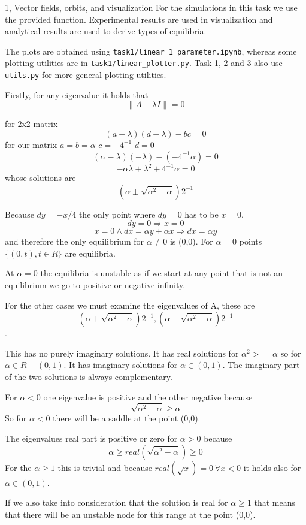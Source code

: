 \begin{task}{1, Vector fields, orbits, and visualization}
For the simulations in this task we use the provided function. Experimental results are used in visualization and analytical results are used to derive types of equilibria.

The plots are obtained using \verb|task1/linear_1_parameter.ipynb|, whereas some plotting utilities are in \verb|task1/linear_plotter.py|. Task 1, 2 and 3 also use \verb|utils.py| for more general plotting utilities.

Firstly, for any eigenvalue it holds that
$$\| A - \lambda I\| = 0$$

for 2x2 matrix
$$(a - \lambda)(d - \lambda) - bc = 0$$
for our matrix $a = b = \alpha$ $c = -4^{-1}$ $d = 0$
$$(\alpha - \lambda)(- \lambda) - (- 4^{-1}\alpha) = 0$$
$$- \alpha\lambda + \lambda^2 + 4^{-1}\alpha = 0$$
whose solutions are
$$(\alpha \pm \sqrt{\alpha^2 - \alpha})2^{-1}$$

Because $dy = -x/4$ the only point where $dy = 0$ has to be $x = 0$. $$dy = 0 \Rightarrow x = 0$$ $$x = 0 \land dx = \alpha y + \alpha x \Rightarrow dx = \alpha y$$ and therefore the only equilibrium for $\alpha \neq 0$ is (0,0). For $\alpha = 0$ points $\{(0,t), t \in R\}$ are equilibria.

At $\alpha = 0$ the equilibria is unstable as if we start at any point that is not an equilibrium we go to positive or negative infinity.

For the other cases we must examine the eigenvalues of A, these are $$(\alpha + \sqrt{\alpha^2-\alpha})2^{-1}, (\alpha - \sqrt{\alpha^2-\alpha})2^{-1}$$.

This has no purely imaginary solutions.
It has real solutions for $\alpha^2 >= \alpha$ so for $\alpha \in R - (0,1)$.
It has imaginary solutions for $\alpha \in (0,1)$. The imaginary part of the two solutions is always complementary.

For $\alpha < 0$ one eigenvalue is positive and the other negative because $$\sqrt{\alpha^2-\alpha} \geq \alpha$$
So for $\alpha < 0$ there will be a saddle at the point (0,0).

The eigenvalues real part is positive or zero for $\alpha > 0$ because 
$$\alpha \geq real(\sqrt{\alpha^2-\alpha}) \geq 0$$
For the $\alpha \geq 1$ this is trivial and because $real(\sqrt{x}) = 0 \ \forall x < 0$ it holds also for $\alpha \in (0,1)$.

If we also take into consideration that the solution is real for $\alpha \geq 1$ that means that there will be an unstable node for this range at the point (0,0).


\end{task}
